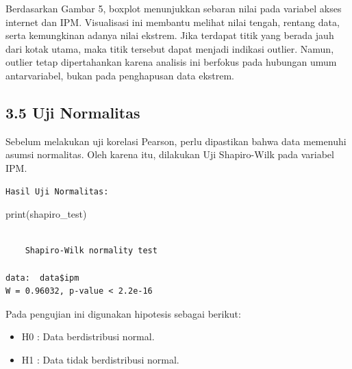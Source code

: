 \documentclass[
  indonesian,
  letterpaper,
  DIV=11,
  numbers=noendperiod]{scrartcl}
\newenvironment{Shaded}{\begin{snugshade}}{\end{snugshade}}
\newcommand{\FunctionTok}[1]{\textcolor[rgb]{0.28,0.35,0.67}{#1}}
\newcommand{\NormalTok}[1]{\textcolor[rgb]{0.00,0.23,0.31}{#1}}
\newcommand{\OtherTok}[1]{\textcolor[rgb]{0.00,0.23,0.31}{#1}}
\newcommand{\SpecialCharTok}[1]{\textcolor[rgb]{0.37,0.37,0.37}{#1}}
\newcommand{\StringTok}[1]{\textcolor[rgb]{0.13,0.47,0.30}{#1}}
\begin{document}
Berdasarkan Gambar 5, boxplot menunjukkan sebaran nilai pada variabel
akses internet dan IPM. Visualisasi ini membantu melihat nilai tengah,
rentang data, serta kemungkinan adanya nilai ekstrem. Jika terdapat
titik yang berada jauh dari kotak utama, maka titik tersebut dapat
menjadi indikasi outlier. Namun, outlier tetap dipertahankan karena
analisis ini berfokus pada hubungan umum antarvariabel, bukan pada
penghapusan data ekstrem.

\subsection{3.5 Uji Normalitas}\label{uji-normalitas}

Sebelum melakukan uji korelasi Pearson, perlu dipastikan bahwa data
memenuhi asumsi normalitas. Oleh karena itu, dilakukan Uji Shapiro-Wilk
pada variabel IPM.

\begin{Shaded}
\end{Shaded}

\begin{verbatim}
Hasil Uji Normalitas:
\end{verbatim}

\begin{Shaded}
\begin{Highlighting}[]
\FunctionTok{print}\NormalTok{(shapiro\_test)}
\end{Highlighting}
\end{Shaded}

\begin{verbatim}

    Shapiro-Wilk normality test

data:  data$ipm
W = 0.96032, p-value < 2.2e-16
\end{verbatim}

Pada pengujian ini digunakan hipotesis sebagai berikut:

\begin{itemize}
\item
  H0 : Data berdistribusi normal.
\item
  H1 : Data tidak berdistribusi normal.
\end{itemize}
\end{document}
